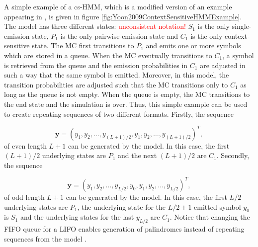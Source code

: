 \documentclass{article}
\begin{document}
A simple example of a cs-HMM, which is a modified version of an example appearing in \cite{Yoon2009}, is given in figure \ref{fig:Yoon2009ContextSensitiveHMMExample}. The model has three different states: \textcolor{red}{unconsistent notation!} $S_1$ is the only single-emission state, $P_1$ is the only pairwise-emission state and $C_1$ is the only context-sensitive state. The MC first transitions to $P_1$ and emits one or more symbols which are stored in a queue. When the MC eventually transitions to $C_1$, a symbol is retrieved from the queue and the emission probabilities in $C_1$ are adjusted in such a way that the same symbol is emitted. Moreover, in this model, the transition probabilities are adjusted such that the MC transitions only to $C_1$ as long as the queue is not empty. When the queue is empty, the MC transitions to the end state and the simulation is over. Thus, this simple example can be used to create repeating sequences of two different formats. Firstly, the sequence 

\begin{equation*}
    \mathbf{y} = (y_1, y_2, \ldots, y_{(L+1)/2}, y_1, y_2, \ldots, y_{(L+1)/2})^T, 
\end{equation*}
of even length $L+1$ can be generated by the model. In this case, the first $(L+1)/2$ underlying states are $P_1$ and the next $(L+1)/2$ are $C_1$. Secondly, the sequence 

\begin{equation*}
    \mathbf{y} = (y_1, y_2, \ldots, y_{L/2}, y_0, y_1, y_2, \ldots, y_{L/2})^T,
\end{equation*}
of odd length $L+1$ can be generated by the model. In this case, the first $L/2$ underlying states are $P_1$, the underlying state for the $L/2 + 1$ emitted symbol $y_0$ is $S_1$ and the underlying states for the last $y_{L/2}$ are $C_1$. Notice that changing the FIFO queue for a LIFO enables generation of  palindromes instead of repeating sequences from the model \cite{Yoon2009}. 
\end{document}
